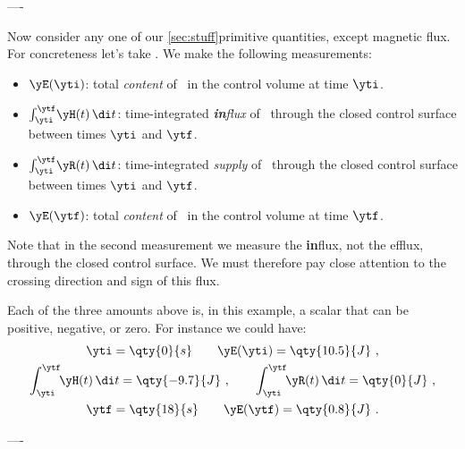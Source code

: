 ----


Now consider any one of our \autoref{sec:stuff}{primitive quantities}, except magnetic flux. For concreteness let's take \emph{\energym}. We make the following measurements:
\begin{itemize}[itemsep=1ex]
\item $\yE(\yti)$: total \emph{content} of \energym\ in the control volume at time $\yti$.

\item $\int_{\yti}^{\ytf}\!\yH(t)\, \di t$: time-integrated \emph{\textbf{in}flux} of \energym\ through the closed control surface between times $\yti$ and $\ytf$.

\item $\int_{\yti}^{\ytf}\!\yR(t)\, \di t$: time-integrated \emph{supply} of \energym\ through the closed control surface between times $\yti$ and $\ytf$.

\item $\yE(\ytf)$: total \emph{content} of \energym\ in the control volume at time $\ytf$.
\end{itemize}
Note that in the second measurement we measure the \textbf{in}flux, not the efflux, through the closed control surface. We must therefore pay close attention to the crossing direction and sign of this flux.

Each of the three amounts above is, in this example, a scalar that can be positive, negative, or zero. For instance we could have:
\begin{equation*}
  \begin{gathered}
    \yti = \qty{0}{s} \qquad \yE(\yti) = \qty{10.5}{J}\ ,
    \\
    \int_{\yti}^{\ytf}\!\!\yH(t)\, \di t = \qty{-9.7}{J} \ ,
    \qquad
    \int_{\yti}^{\ytf}\!\!\yR(t)\, \di t = \qty{0}{J} \ ,
    \\
    \ytf = \qty{18}{s} \qquad \yE(\ytf) = \qty{0.8}{J} \ .
  \end{gathered}
\end{equation*}


----



